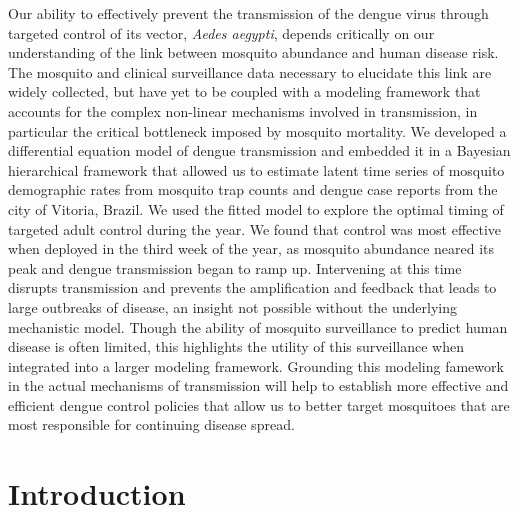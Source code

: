 \documentclass[10pt,letterpaper]{article}
\begin{document}
Our ability to effectively prevent the transmission of the dengue virus through targeted control of its vector, \emph{Aedes aegypti}, depends critically on our understanding of the link between mosquito abundance and human disease risk.
The mosquito and clinical surveillance data necessary to elucidate this link are widely collected, but have yet to be coupled with a modeling framework that accounts for the complex non-linear mechanisms involved in transmission, in particular the critical bottleneck imposed by mosquito mortality.
We developed a differential equation model of dengue transmission and embedded it in a Bayesian hierarchical framework that allowed us to estimate latent time series of mosquito demographic rates from mosquito trap counts and dengue case reports from the city of Vitoria, Brazil.
We used the fitted model to explore the optimal timing of targeted adult control during the year.
We found that control was most effective when deployed in the third week of the year, as mosquito abundance neared its peak and dengue transmission began to ramp up.
Intervening at this time disrupts transmission and prevents the amplification and feedback that leads to large outbreaks of disease, an insight not possible without the underlying mechanistic model.
Though the ability of mosquito surveillance to predict human disease is often limited, this highlights the utility of this surveillance when integrated into a larger modeling framework.
Grounding this modeling famework in the actual mechanisms of transmission will help to establish more effective and efficient dengue control policies that allow us to better target mosquitoes that are most responsible for continuing disease spread. 


\linenumbers

\section*{Introduction}
\end{document}
